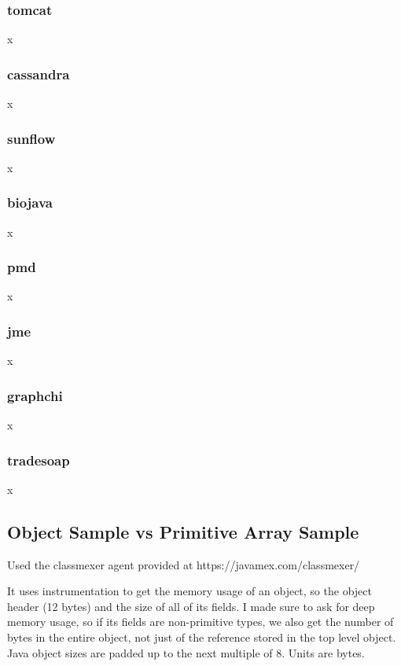 \documentclass{article}
\begin{document}
\subsubsection{tomcat} x
    
\subsubsection{cassandra} x
    
\subsubsection{sunflow} x
    
\subsubsection{biojava} x
    
\subsubsection{pmd} x
    
\subsubsection{jme} x
    
\subsubsection{graphchi} x
    
\subsubsection{tradesoap} x
    
    
\subsection{Object Sample vs Primitive Array Sample}
Used the classmexer agent provided at https://javamex.com/classmexer/

It uses instrumentation to get the memory usage of an object, so the object header
(12 bytes) and the size of all of its fields. I made sure to ask for deep memory
usage, so if its fields are non-primitive types, we also get the number of bytes
in the entire object, not just of the reference stored in the top level object. Java
object sizes are padded up to the next multiple of 8. Units are bytes.
\end{document}
